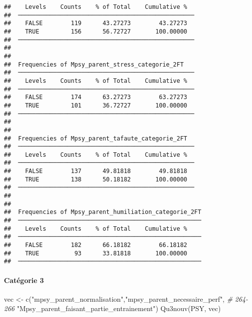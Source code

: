 \documentclass[
]{article}
\newenvironment{Shaded}{\begin{snugshade}}{\end{snugshade}}
\newcommand{\CommentTok}[1]{\textcolor[rgb]{0.56,0.35,0.01}{\textit{#1}}}
\newcommand{\FunctionTok}[1]{\textcolor[rgb]{0.00,0.00,0.00}{#1}}
\newcommand{\NormalTok}[1]{#1}
\newcommand{\OtherTok}[1]{\textcolor[rgb]{0.56,0.35,0.01}{#1}}
\newcommand{\StringTok}[1]{\textcolor[rgb]{0.31,0.60,0.02}{#1}}
\begin{document}
\begin{verbatim}
##    Levels    Counts    % of Total    Cumulative %   
##  ────────────────────────────────────────────────── 
##    FALSE        119      43.27273        43.27273   
##    TRUE         156      56.72727       100.00000   
##  ────────────────────────────────────────────────── 
## 
## 
##  Frequencies of Mpsy_parent_stress_categorie_2FT    
##  ────────────────────────────────────────────────── 
##    Levels    Counts    % of Total    Cumulative %   
##  ────────────────────────────────────────────────── 
##    FALSE        174      63.27273        63.27273   
##    TRUE         101      36.72727       100.00000   
##  ────────────────────────────────────────────────── 
## 
## 
##  Frequencies of Mpsy_parent_tafaute_categorie_2FT   
##  ────────────────────────────────────────────────── 
##    Levels    Counts    % of Total    Cumulative %   
##  ────────────────────────────────────────────────── 
##    FALSE        137      49.81818        49.81818   
##    TRUE         138      50.18182       100.00000   
##  ────────────────────────────────────────────────── 
## 
## 
##  Frequencies of Mpsy_parent_humiliation_categorie_2FT 
##  ──────────────────────────────────────────────────── 
##    Levels    Counts    % of Total    Cumulative %   
##  ──────────────────────────────────────────────────── 
##    FALSE        182      66.18182        66.18182   
##    TRUE          93      33.81818       100.00000   
##  ────────────────────────────────────────────────────
\end{verbatim}

\hypertarget{catuxe9gorie-3-2}{%
\paragraph{Catégorie 3}\label{catuxe9gorie-3-2}}

\begin{Shaded}
\begin{Highlighting}[]
\NormalTok{vec }\OtherTok{\textless{}{-}} \FunctionTok{c}\NormalTok{(}\StringTok{"mpsy\_parent\_normalisation"}\NormalTok{,}\StringTok{"mpsy\_parent\_necessaire\_perf"}\NormalTok{,  }\CommentTok{\# 264{-}266}
                 \StringTok{"Mpsy\_parent\_faisant\_partie\_entrainement"}\NormalTok{)}
\FunctionTok{Qu3nouv}\NormalTok{(PSY, vec)}
\end{Highlighting}
\end{Shaded}
\end{document}
